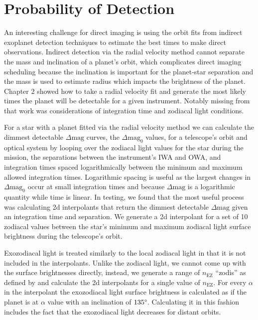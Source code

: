 
\section{Probability of Detection} %
\label{section:impact_on_pdet}

An interesting challenge for direct imaging is using the orbit fits from
indirect exoplanet detection techniques to estimate the best times to make
direct observations. Indirect detection via the radial velocity method cannot
separate the mass and inclination of a planet's orbit, which complicates direct
imaging scheduling because the inclination is important for the planet-star
separation and the mass is used to estimate radius which impacts the brightness
of the planet. Chapter 2 showed how to take a radial velocity fit and generate
the most likely times the planet will be detectable for a given instrument.
Notably missing from that work was considerations of integration time and
zodiacal light conditions.

For a star with a planet fitted via the radial velocity method we can calculate
the dimmest detectable $\Delta\textrm{mag}$ curves, the $\Delta\textrm{mag}_0$
values, for a telescope's orbit and optical system by looping over the zodiacal
light values for the star during the mission, the separations between the
instrument's IWA and OWA, and integration times spaced logarithmically between
the minimum and maximum allowed integration times. Logarithmic spacing is
useful as the largest changes in $\Delta\textrm{mag}_0$ occur at small
integration times and because $\Delta\textrm{mag}$ is a logarithmic quantity
while time is linear. In testing, we found that the most useful process was
calculating 2d interpolants that return the dimmest detectable
$\Delta\textrm{mag}$ given an integration time and separation. We generate a 2d
interpolant for a set of 10 zodiacal values between the star's minimum and
maximum zodiacal light surface brightness during the telescope's orbit. 

Exozodiacal light is treated similarly to the local zodiacal light in that it
is not included in the interpolants. Unlike the zodiacal light, we cannot come
up with the surface brightnesses directly, instead, we generate a range of
$n_\textrm{EZ}$ ``zodis'' as defined by
\citet{starkMaximizingExoEarthCandidate2014} and calculate the 2d interpolants
for a single value of $n_\textrm{EZ}$. For every $\alpha$ in the interpolant
the exozodiacal light surface brightness is calculated as if the planet is at
$\alpha$ value with an inclination of $135\degree$. Calculating it in this
fashion includes the fact that the exozodiacal light decreases for distant
orbits.

